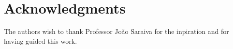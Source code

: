 \section*{Acknowledgments}
The authors wish to thank Professor João Saraiva for the inpiration and for having guided this work.

